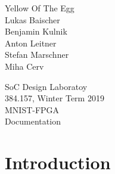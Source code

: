\documentclass[a4paper]{article}
\begin{document}

\begin{titlepage}
	
	\begin{flushright}
		
		
		\Large 
		Yellow Of The Egg\\
		\large
		Lukas Baischer	\\
		Benjamin Kulnik	\\
		Anton Leitner \\
		Stefan Marschner \\
		Miha Cerv \\
		
	\end{flushright}
	
	\vspace{5em}
	
	\begin{center}
		{\Large SoC Design Laboratoy}\\[1em]
		{\large 384.157, Winter Term 2019} \\[5em]

		
		{\Huge MNIST-FPGA\\[.5em]
		\huge Documentation}\\[10em]
	\end{center}

\end{titlepage}


\begin{acronym}
\end{acronym}


\tableofcontents
\clearpage

\section{Introduction}
\end{document}
